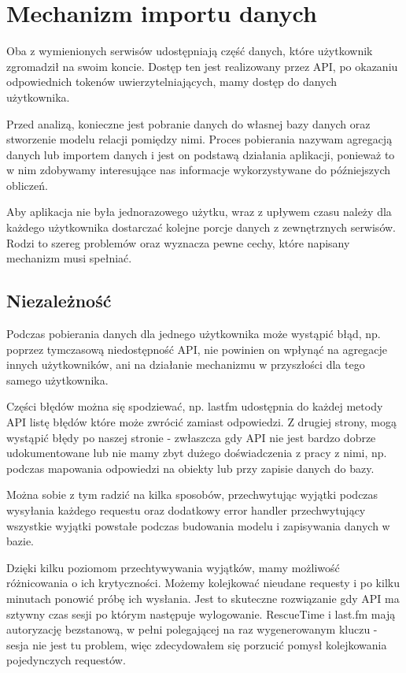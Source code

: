 \documentclass[brudnopis]{xmgr}
\begin{document}
    \section{Mechanizm importu danych}
        Oba z wymienionych serwisów udostępniają część danych, które użytkownik zgromadził na swoim koncie.
        Dostęp ten jest realizowany przez API, po okazaniu odpowiednich tokenów uwierzytelniających, mamy dostęp do danych użytkownika.

        Przed analizą, konieczne jest pobranie danych do własnej bazy danych oraz stworzenie modelu relacji pomiędzy nimi.
        Proces pobierania nazywam agregacją danych lub importem danych i jest on podstawą działania aplikacji,
        ponieważ to w nim zdobywamy interesujące nas informacje wykorzystywane do późniejszych obliczeń.

        Aby aplikacja nie była jednorazowego użytku, wraz z upływem czasu należy dla każdego użytkownika dostarczać
        kolejne porcje danych z zewnętrznych serwisów.
        Rodzi to szereg problemów oraz wyznacza pewne cechy, które napisany mechanizm musi spełniać.

        \subsection*{Niezależność}
            Podczas pobierania danych dla jednego użytkownika może wystąpić błąd, np. poprzez tymczasową niedostępność API,
            nie powinien on wpłynąć na agregacje innych użytkowników, ani na działanie mechanizmu w przyszłości dla tego samego użytkownika.

            Części błędów można się spodziewać, np. lastfm udostępnia do każdej metody API listę błędów które może zwrócić zamiast odpowiedzi.
            Z drugiej strony, mogą wystąpić błędy po naszej stronie - zwłaszcza gdy API nie jest bardzo dobrze udokumentowane
            lub nie mamy zbyt dużego doświadczenia z pracy z nimi, np. podczas mapowania odpowiedzi na obiekty lub przy zapisie danych do bazy.

            Można sobie z tym radzić na kilka sposobów, przechwytując wyjątki podczas wysyłania każdego requestu
            oraz dodatkowy error handler przechwytujący wszystkie wyjątki powstałe podczas budowania modelu i zapisywania danych w bazie.

            Dzięki kilku poziomom przechtywywania wyjątków, mamy możliwość różnicowania o ich krytyczności. 
            Możemy kolejkować nieudane requesty i po kilku minutach ponowić próbę ich wysłania. Jest to skuteczne rozwiązanie gdy API ma sztywny czas sesji po którym następuje wylogowanie.
            RescueTime i last.fm mają autoryzację bezstanową, w pełni polegającej na raz wygenerowanym kluczu - sesja nie jest tu problem, więc zdecydowałem się porzucić pomysł kolejkowania pojedynczych requestów.
\end{document}
